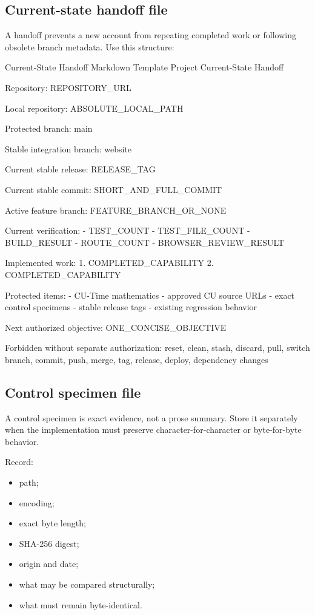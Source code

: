 \documentclass[11pt,letterpaper]{article}
\begin{document}
\subsection{Current-state handoff file}

A handoff prevents a new account from repeating completed work or following
obsolete branch metadata. Use this structure:

\begin{codebox}{Current-State Handoff Markdown Template}
Project Current-State Handoff

Repository:
REPOSITORY_URL

Local repository:
ABSOLUTE_LOCAL_PATH

Protected branch:
main

Stable integration branch:
website

Current stable release:
RELEASE_TAG

Current stable commit:
SHORT_AND_FULL_COMMIT

Active feature branch:
FEATURE_BRANCH_OR_NONE

Current verification:
- TEST_COUNT
- TEST_FILE_COUNT
- BUILD_RESULT
- ROUTE_COUNT
- BROWSER_REVIEW_RESULT

Implemented work:
1. COMPLETED_CAPABILITY
2. COMPLETED_CAPABILITY

Protected items:
- CU-Time mathematics
- approved CU source URLs
- exact control specimens
- stable release tags
- existing regression behavior

Next authorized objective:
ONE_CONCISE_OBJECTIVE

Forbidden without separate authorization:
reset, clean, stash, discard, pull, switch branch, commit, push,
merge, tag, release, deploy, dependency changes
\end{codebox}

\subsection{Control specimen file}

A control specimen is exact evidence, not a prose summary. Store it separately
when the implementation must preserve character-for-character or byte-for-byte
behavior.

Record:

\begin{itemize}
    \item path;
    \item encoding;
    \item exact byte length;
    \item SHA-256 digest;
    \item origin and date;
    \item what may be compared structurally;
    \item what must remain byte-identical.
\end{itemize}
\end{document}
